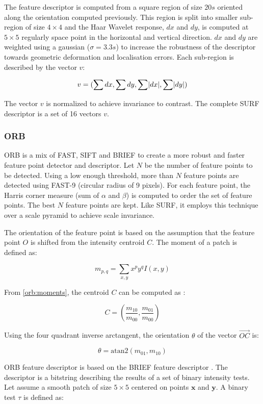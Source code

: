 \documentclass[12pt]{article}
\begin{document}
The feature descriptor is computed from a square region of size $20s$ oriented along the orientation computed previously. This region is split into smaller sub-region of size $4\times4$ and the Haar Wavelet response, $dx$ and $dy$, is computed at  $5\times5$ regularly space point in the horizontal and vertical direction. $dx$ and $dy$ are weighted using a gaussian ($\sigma=3.3s$) to increase the robustness of the descriptor towards geometric deformation and localisation errors. Each sub-region is described by the vector $v$:

\[
v = (\sum{dx}, \sum{dy}, \sum{\abs{dx}}, \sum{\abs{dy}})
\]

The vector $v$ is normalized to achieve invariance to contrast. The complete SURF descriptor is a set of 16 vectors $v$.

\subsubsection{ORB}

ORB\cite{Orb11} is a mix of FAST, SIFT and BRIEF to create a more robust and faster feature point detector and descriptor. Let $N$ be the number of feature points to be detected. Using a low enough threshold, more than $N$ feature points are detected using FAST-9 (circular radius of 9 pixels). For each feature point, the Harris corner measure (sum of $\alpha$ and $\beta$) is computed to order the set of feature points. The best $N$ feature points are kept. Like SURF, it employs this technique over a scale pyramid to achieve scale invariance.

The orientation of the feature point is based on the assumption that the feature point $O$ is shifted from the intensity centroid $C$. The moment of a patch is defined as:

\begin{equation}
  \label{orb:moments}
  m_{p,q} = \sum_{x,y} x^py^q I(x,y)
\end{equation}

From \ref{orb:moments}, the centroid $C$ can be computed as :

\[
  C = \left ( \frac{m_{10}}{m_{00}}, \frac{m_{01}}{m_{00}} \right )
\]

Using the four quadrant inverse arctangent, the orientation $\theta$ of the vector $\overrightarrow{OC}$ is:

\[
  \theta = \text{atan2}(m_{01}, m_{10})
\]

ORB feature descriptor is based on the BRIEF feature descriptor \cite{Brief10}. The descriptor is a bitstring describing the results of a set of binary intensity tests. Let assume a smooth patch of size $5\times 5$ centered on points $\mathbf{x}$ and $\mathbf{y}$. A binary test $\tau$ is defined as:
\end{document}
